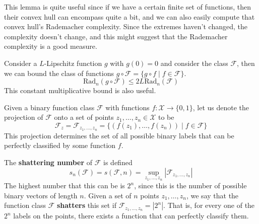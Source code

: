 \documentclass{article}
\begin{document}
    This lemma is quite useful since if we have a certain finite set of functions, then their convex hull can encompass quite a bit, and we can also easily compute that convex hull's Rademacher complexity. Since the extremes haven't changed, the complexity doesn't change, and this might suggest that the Rademacher complexity is a good measure. 

    \begin{lemma}
      Consider a $L$-Lipschitz function $g$  with $g(0) = 0$ and consider the class $\mathcal{F}$, then we can bound the class of functions $g \circ \mathcal{F} = \{ g \circ f \mid f \in \mathcal{F} \}$. 
      \begin{equation}
        \mathrm{Rad}_n (g \circ \mathcal{F}) \leq 2 L \mathrm{Rad}_n (\mathcal{F})
      \end{equation}
      This constant multiplicative bound is also useful. 
    \end{lemma}

    \begin{definition}
      Given a binary function class $\mathcal{F}$ with functions $f: \mathcal{X} \rightarrow \{0, 1\}$, let us denote the projection of $\mathcal{F}$ onto a set of points $z_1, \ldots, z_n \in \mathcal{X}$ to be 
      \begin{equation}
        \mathcal{F}_z = \mathcal{F}_{z_1, \ldots, z_n} = \{ (f(z_1), \ldots, f(z_n)) \mid f \in \mathcal{F} \}
      \end{equation}
      This projection determines the set of all possible binary labels that can be perfectly classified by some function $f$. 
    \end{definition}

    \begin{definition}
      The \textbf{shattering number} of $\mathcal{F}$ is defined 
      \begin{equation}
        s_n (\mathcal{F}) = s(\mathcal{F}, n) = \sup_{z_1, \ldots, z_n} |\mathcal{F}_{z_1, \ldots, z_n}|
      \end{equation}
      The highest number that this can be is $2^n$, since this is the number of possible binary vectors of length $n$. Given a set of $n$ points $z_1, \ldots, z_n$, we say that the function class $\mathcal{F}$ \textbf{shatters} this set if $\mathcal{F}_{z_1, \ldots, z_n} = |2^n|$. That is, for every one of the $2^n$ labels on the points, there exists a function that can perfectly classify them. 
    \end{definition}
\end{document}
